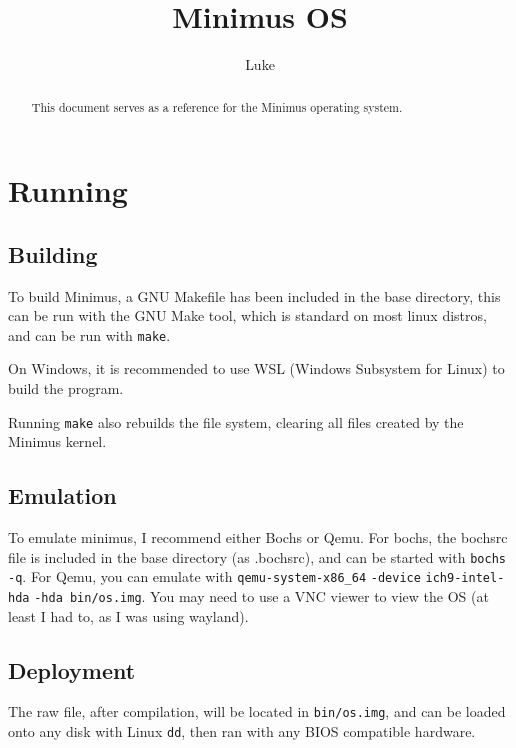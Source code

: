 \documentclass{article}
\title{Minimus OS}
\author{Luke}
\begin{document}
\maketitle

\begin{abstract}

This document serves as a reference for the Minimus operating system.

\end{abstract}

\newpage

\tableofcontents

\newpage

\section{Running}

\subsection{Building}

To build Minimus, a GNU Makefile has been included in the base directory,
this can be run with the GNU Make tool, which is standard on most linux
distros, and can be run with \verb|make|.

On Windows, it is recommended to use WSL (Windows Subsystem for Linux) to
build the program.

Running \verb|make| also rebuilds the file system, clearing all files created
by the Minimus kernel.

\subsection{Emulation}

To emulate minimus, I recommend either Bochs or Qemu. For bochs, the bochsrc
file is included in the base directory (as .bochsrc), and can be started with
\verb|bochs -q|. For Qemu, you can emulate with
\verb|qemu-system-x86_64| \verb|-device| \verb|ich9-intel-hda| \verb|-hda bin/os.img|. You may need to
use a VNC viewer to view the OS (at least I had to, as I was using wayland).

\subsection{Deployment}

The raw file, after compilation, will be located in \verb|bin/os.img|, and can
be loaded onto any disk with Linux \verb|dd|, then ran with any BIOS compatible
hardware.
\end{document}
